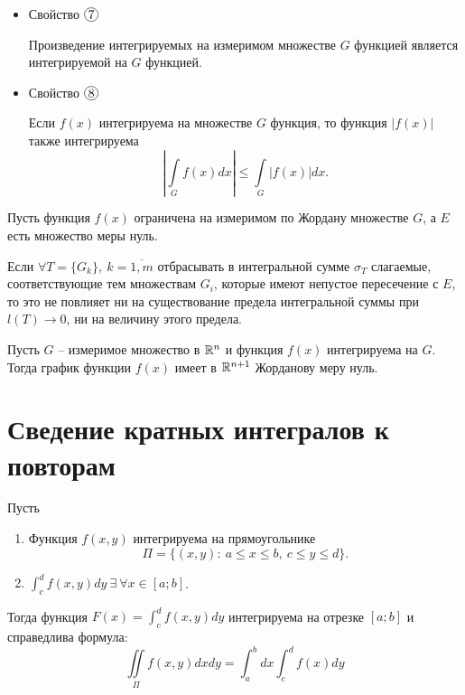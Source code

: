 \begin{itemize}
    \item Свойство $ \circled{7} $
          \begin{statement}
              Произведение интегрируемых на измеримом множестве $ G $ функцией является интегрируемой на $ G $ функцией.
          \end{statement}

    \item Свойство $ \circled{8} $
          \begin{statement}
              Если $ f(x) $ интегрируема на множестве $ G $ функция, то функция $ \big| f(x) \big| $ также интегрируема
              \[
                  \left|\underset{G}{\int}f(x)dx\right| \leqslant \underset{G}{\int}\big|f(x)\big|dx.
              \]
          \end{statement}
\end{itemize}

\begin{lemma}
    Пусть функция $ f(x) $ ограничена на измеримом по Жордану множестве $ G $, а $ E $ есть множество меры нуль.

    Если $ \forall T = \{G_k\}, \ k = \overline{1,m} $ отбрасывать в интегральной сумме $ \sigma_T $ слагаемые, соответствующие тем множествам $ G_i $, которые имеют непустое пересечение с $ E $, то это не повлияет ни на существование предела интегральной суммы при $ l(T)\rightarrow0 $, ни на величину этого предела.
\end{lemma}

\begin{theorem}
    Пусть $ G $ -- измеримое множество в $ \mathbb{R}^n $ и функция $ f(x) $ интегрируема на $ G $. Тогда график функции $ f(x) $ имеет в $ \mathbb{R}^{n+1} $ Жорданову меру нуль.
\end{theorem}

\newpage

\section{Сведение кратных интегралов к повторам}

\begin{theorem}
    Пусть
    \begin{enumerate}
        \item Функция $ f(x,y) $ интегрируема на прямоугольнике
              \[
                  \Pi = \big\{(x,y): \ a \leqslant x \leqslant b, \ c \leqslant y \leqslant d\big\}.
              \]

        \item $ \int_{c}^{d}f(x,y)dy \ \exists \ \forall x \in [a;b] $.
    \end{enumerate}

    Тогда функция $ F(x) = \int_{c}^{d}f(x,y)dy $ интегрируема на отрезке $ [a;b] $ и справедлива формула:
    \[
        \boxed{\iint\limits_\Pi f(x,y)dxdy = \int_{a}^{b}dx \int_{c}^{d}f(x)dy}
    \]
\end{theorem}

